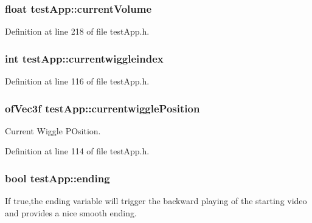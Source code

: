\hypertarget{classtest_app_a51c20c5432d9f6b06f719526d9a34ee6}{
\subsubsection[{current\-Volume}]{\setlength{\rightskip}{0pt plus 5cm}float test\-App\-::current\-Volume}}\label{classtest_app_a51c20c5432d9f6b06f719526d9a34ee6}


Definition at line 218 of file test\-App.\-h.

\hypertarget{classtest_app_a6b9af0b1ae4a2c0530eb6a8cf8340751}{
\subsubsection[{currentwiggleindex}]{\setlength{\rightskip}{0pt plus 5cm}int test\-App\-::currentwiggleindex}}\label{classtest_app_a6b9af0b1ae4a2c0530eb6a8cf8340751}


Definition at line 116 of file test\-App.\-h.

\hypertarget{classtest_app_af81358868ae15faab1974ec074b1509f}{
\subsubsection[{currentwiggle\-Position}]{\setlength{\rightskip}{0pt plus 5cm}of\-Vec3f test\-App\-::currentwiggle\-Position}}\label{classtest_app_af81358868ae15faab1974ec074b1509f}


Current Wiggle P\-Osition. 



Definition at line 114 of file test\-App.\-h.

\hypertarget{classtest_app_acf09303bc452d2a38098f6bf94655408}{
\subsubsection[{ending}]{\setlength{\rightskip}{0pt plus 5cm}bool test\-App\-::ending}}\label{classtest_app_acf09303bc452d2a38098f6bf94655408}


If true,the ending variable will trigger the backward playing of the starting video and provides a nice smooth ending. 



